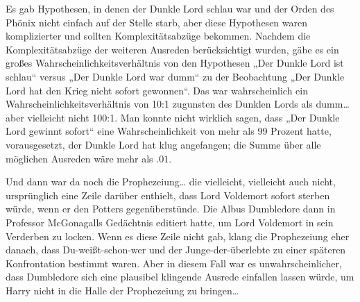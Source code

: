 Es gab Hypothesen, in denen der Dunkle Lord schlau war und der Orden des Phönix nicht einfach auf der Stelle starb, aber diese Hypothesen waren komplizierter und sollten Komplexitätsabzüge bekommen. Nachdem die Komplexitätsabzüge der weiteren Ausreden berücksichtigt wurden, gäbe es ein großes Wahrscheinlichkeitsverhältnis von den Hypothesen „Der Dunkle Lord ist schlau“ versus „Der Dunkle Lord war dumm“ zu der Beobachtung „Der Dunkle Lord hat den Krieg nicht sofort gewonnen“. Das war wahrscheinlich ein Wahrscheinlichkeitsverhältnis von 10:1 zugunsten des Dunklen Lords als dumm… aber vielleicht nicht 100:1. Man konnte nicht wirklich sagen, dass „Der Dunkle Lord gewinnt sofort“ eine Wahrscheinlichkeit von mehr als 99 Prozent hatte, vorausgesetzt, der Dunkle Lord hat klug angefangen; die Summe über alle möglichen Ausreden wäre mehr als $.01$.


Und dann war da noch die Prophezeiung… die vielleicht, vielleicht auch nicht, ursprünglich eine Zeile darüber enthielt, dass Lord Voldemort sofort sterben würde, wenn er den Potters gegenüberstünde. Die Albus Dumbledore dann in Professor McGonagalls Gedächtnis editiert hatte, um Lord Voldemort in sein Verderben zu locken. Wenn es diese Zeile nicht gab, klang die Prophezeiung eher danach, dass Du-weißt-schon-wer und der Junge-der-überlebte zu einer späteren Konfrontation bestimmt waren. Aber in diesem Fall war es unwahrscheinlicher, dass Dumbledore sich eine plausibel klingende Ausrede einfallen lassen würde, um Harry nicht in die Halle der Prophezeiung zu bringen…

